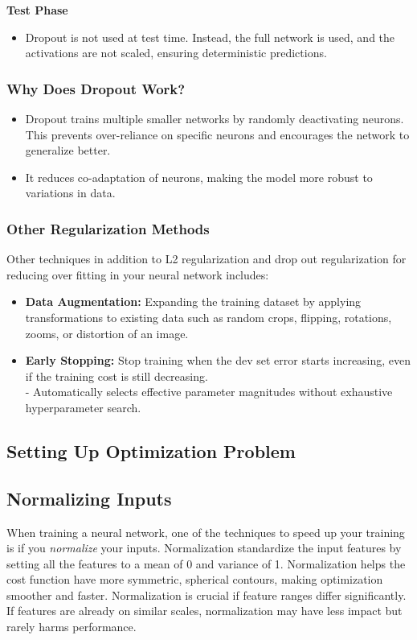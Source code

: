 \documentclass[letterpaper,12pt,notitlepage,twoside]{report}
\begin{document}
\textbf{Test Phase}
\begin{itemize}
    \item Dropout is not used at test time. Instead, the full network is used, and the activations are not scaled, ensuring deterministic predictions.
\end{itemize}

\subsubsection*{Why Does Dropout Work?}
\begin{itemize}
    \item Dropout trains multiple smaller networks by randomly deactivating neurons. This prevents over-reliance on specific neurons and encourages the network to generalize better.
    \item It reduces co-adaptation of neurons, making the model more robust to variations in data.
\end{itemize}

\subsubsection{Other Regularization Methods}
Other techniques in addition to L2 regularization and drop out regularization for reducing over fitting in your neural network includes:
\begin{itemize}[nosep]
\item \textbf{Data Augmentation:} Expanding the training dataset by applying transformations to existing data such as random crops, flipping, rotations, zooms, or distortion of an image.
\item \textbf{Early Stopping:} Stop training when the dev set error starts increasing, even if the training cost is still decreasing. \\
	- Automatically selects effective parameter magnitudes without exhaustive hyperparameter search.
\end{itemize}

\subsection{Setting Up Optimization Problem}
\subsection*{Normalizing Inputs}
When training a neural network, one of the techniques to speed up your training is if you \emph{normalize} your inputs. Normalization standardize the input features by setting all the features to a mean of 0 and variance of 1.  Normalization helps the cost function have more symmetric, spherical contours, making optimization smoother and faster. Normalization is crucial if feature ranges differ significantly. If features are already on similar scales, normalization may have less impact but rarely harms performance.
\end{document}
